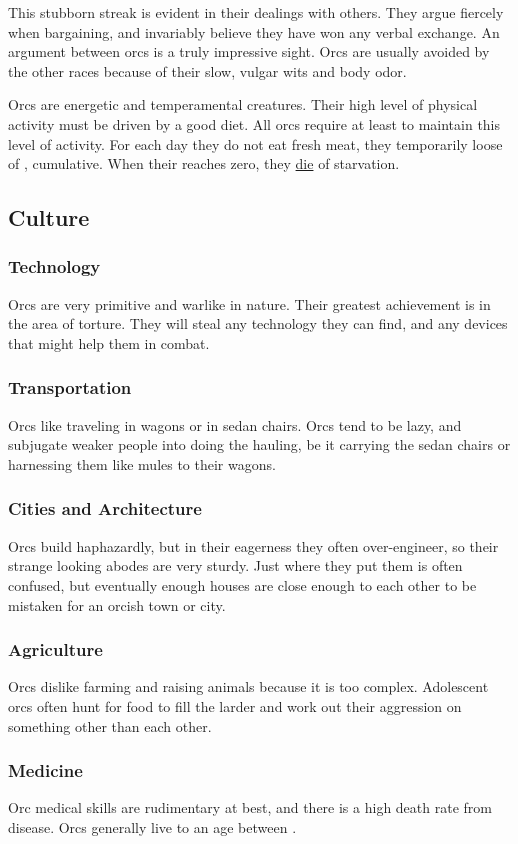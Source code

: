 \begin{multicols*}{2}
This stubborn streak is evident in their dealings with others. They argue fiercely when bargaining, and invariably believe they have won any verbal exchange. An argument between orcs is a truly impressive sight. Orcs are usually avoided by the other races because of their slow, vulgar wits and body odor.

Orcs are energetic and temperamental creatures. Their high level of physical activity must be driven by a good diet. All orcs require at least  to maintain this level of activity. For each day they do not eat fresh meat, they temporarily loose  of \STR, cumulative. When their \STR reaches zero, they \ul{die} of starvation.
\subsection{Culture}
\subsubsection{Technology}
Orcs are very primitive and warlike in nature. Their greatest achievement is in the area of torture. They will steal any technology they can find, and any devices that might help them in combat.
\subsubsection{Transportation}
Orcs like traveling in wagons or in sedan chairs. Orcs tend to be lazy, and subjugate weaker people into doing the hauling, be it carrying the sedan chairs or harnessing them like mules to their wagons.
\subsubsection{Cities and Architecture}
Orcs build haphazardly, but in their eagerness they often over-engineer, so their strange looking abodes are very sturdy. Just where they put them is often confused, but eventually enough houses are close enough to each other to be mistaken for an orcish town or city.
\subsubsection{Agriculture}
Orcs dislike farming and raising animals because it is too complex. Adolescent orcs often hunt for food to fill the larder and work out their aggression on something other than each other.
\subsubsection{Medicine}
Orc medical skills are rudimentary at best, and there is a high death rate from disease. Orcs generally live to an age between .

\end{multicols*}
